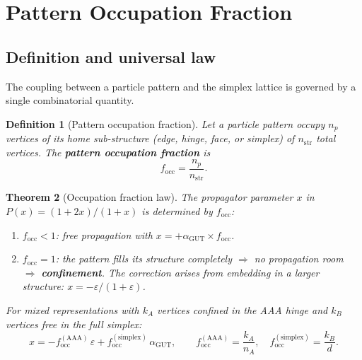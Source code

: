 \documentclass[12pt]{article}
\newtheorem{theorem}{Theorem}[section]
\newtheorem{definition}[theorem]{Definition}
\theoremstyle{remark}
\theoremstyle{definition}
\newcommand{\agut}{\alpha_{\mathrm{GUT}}}
\begin{document}
\section{Pattern Occupation Fraction}
\label{ch:occupation_fraction}

\subsection{Definition and universal law}

The coupling between a particle pattern and the simplex lattice is governed by a single combinatorial quantity.

\begin{definition}[Pattern occupation fraction]
\label{def:f_occ_main}
Let a particle pattern occupy $n_p$ vertices of its home sub-structure (edge, hinge, face, or simplex) of $n_\mathrm{str}$ total vertices.  The \textbf{pattern occupation fraction} is
\begin{equation}
\boxed{f_\mathrm{occ} = \frac{n_p}{n_\mathrm{str}}.}
\end{equation}
\end{definition}

\begin{theorem}[Occupation fraction law]
\label{thm:f_occ_main}
The propagator parameter $x$ in $P(x) = (1+2x)/(1+x)$ is determined by $f_\mathrm{occ}$:
\begin{enumerate}
\item $f_\mathrm{occ} < 1$: free propagation with $x = +\agut \times f_\mathrm{occ}$.
\item $f_\mathrm{occ} = 1$: the pattern fills its structure completely $\Rightarrow$ no propagation room $\Rightarrow$ \textbf{confinement}.  The correction arises from embedding in a larger structure: $x = -\varepsilon/(1+\varepsilon)$.
\end{enumerate}
For mixed representations with $k_A$ vertices confined in the AAA hinge and $k_B$ vertices free in the full simplex:
\begin{equation}
x = -f_\mathrm{occ}^\mathrm{(AAA)}\,\varepsilon + f_\mathrm{occ}^\mathrm{(simplex)}\,\agut, \qquad f_\mathrm{occ}^\mathrm{(AAA)} = \frac{k_A}{n_A}, \quad f_\mathrm{occ}^\mathrm{(simplex)} = \frac{k_B}{d}.
\end{equation}
\end{theorem}
\end{document}
